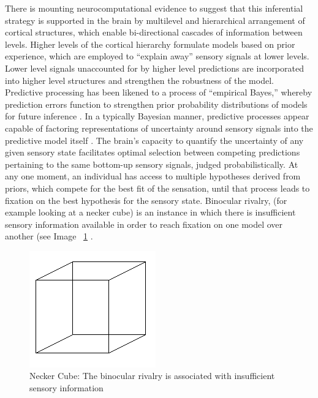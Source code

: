 \begin{CJK}{UTF8}{gbsn}
There is mounting neurocomputational evidence to suggest that this inferential strategy is supported in the brain by multilevel and hierarchical arrangement of cortical structures, which enable bi-directional cascades of information between levels.  Higher levels of the cortical hierarchy formulate models based on prior experience, which are employed to ``explain away'' sensory signals at lower levels. Lower level signals unaccounted for by higher level predictions are incorporated into higher level structures and strengthen the robustness of the model.  Predictive processing has been likened to a process of ``empirical Bayes,'' whereby prediction errors function to strengthen prior probability distributions of models for future inference \citep{Robbins1964}.  In a typically Bayesian manner, predictive processes appear capable of factoring representations of uncertainty around sensory signals into the predictive model itself \citep{Clark2013}.  The brain's capacity to quantify the uncertainty of any given sensory state facilitates optimal selection between competing predictions pertaining to the same bottom-up sensory signals, judged probabilistically.  At any one moment, an individual has access to multiple hypotheses derived from priors, which compete for the best fit of the sensation, until that process leads to fixation on the best hypothesis for the sensory state.
Binocular rivalry, (for example looking at a necker cube) is an instance in which there is insufficient sensory information available in order to reach fixation on one model over another (see Image ~\ref{fig:neckerCube} \citep{Frith2007}.

\begin{figure}[htbp]
  \begin{center}
    \includegraphics{images/Necker_cube.png}
      \caption{Necker Cube: The binocular rivalry is associated with insufficient sensory information}
        \label{fig:neckerCube}
   \end{center}
\end{figure}


\end{CJK}
